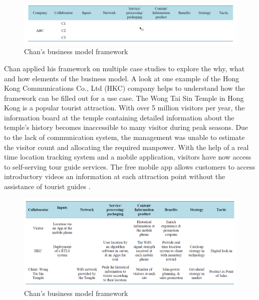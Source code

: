 		\begin{figure}[ht]
		    \begin{center}
		    \includegraphics[scale=0.5]{Talk11/chan.png}
		    \end{center}
		    \caption{Chan's business model framework}
		    \label{fig:chan}
		\end{figure}

		Chan applied his framework on multiple case studies to explore the why, what and how elements of the business model. A look at one example of the Hong Kong Communications Co., Ltd (HKC) company helps to understand how the framework can be filled out for a use case. The Wong Tai Sin Temple in Hong Kong is a popular tourist attraction. With over 5 million visitors per year, the information board at the temple containing detailed information about the temple's history becomes inaccessible to many visitor during peak seasons. Due to the lack of communication system, the management was unable to estimate the visitor count and allocating the required manpower. With the help of a real time location tracking system and a mobile application, visitors have now access to self-serving tour guide services. The free mobile app allows customers to access introductory videos an information at each attraction point without the assistance of tourist guides \cite[p. 560]{chan}. 

		\begin{figure}[ht]
		    \begin{center}
		    \includegraphics[scale=0.5]{Talk11/chanexample.png}
		    \end{center}
		    \caption{Chan's business model framework}
		    \label{fig:chan_ex}
		\end{figure}

